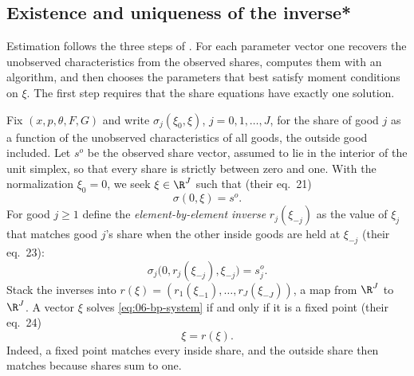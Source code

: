 \subsection{Existence and uniqueness of the inverse*}\label{sec:06-bp-inverse}

Estimation follows the three steps of \citet{BerryLevinsohnPakes1995}. For each parameter vector one recovers the
unobserved characteristics from the observed shares, computes them with an algorithm, and then chooses the parameters
that best satisfy moment conditions on $\xi$. The first step requires that the share equations have exactly one
solution.

Fix $(x, p, \theta, F, G)$ and write $\sigma_j(\xi_0, \xi)$, $j = 0, 1, \dots, J$, for the share of good $j$ as a function of
the unobserved characteristics of all goods, the outside good included. Let $s^o$ be the observed share vector, assumed
to lie in the interior of the unit simplex, so that every share is strictly between zero and one. With the normalization
$\xi_0 = 0$, we seek $\xi \in \R^J$ such that (their eq.~21)
\begin{equation}\label{eq:06-bp-system}
  \sigma(0, \xi) = s^o .
\end{equation}
For good $j \ge 1$ define the \emph{element-by-element inverse} $r_j(\xi_{-j})$ as the value of $\xi_j$ that matches good
$j$'s share when the other inside goods are held at $\xi_{-j}$ (their eq.~23):
\begin{equation}\label{eq:06-bp-r}
  \sigma_j\bigl(0, r_j(\xi_{-j}), \xi_{-j}\bigr) = s^o_j .
\end{equation}
Stack the inverses into $r(\xi) = (r_1(\xi_{-1}), \dots, r_J(\xi_{-J}))$, a map from $\R^J$ to $\R^J$. A vector $\xi$ solves
\eqref{eq:06-bp-system} if and only if it is a fixed point (their eq.~24)
\begin{equation}\label{eq:06-bp-fixedpoint}
  \xi = r(\xi) .
\end{equation}
Indeed, a fixed point matches every inside share, and the outside share then matches because shares sum to one.

